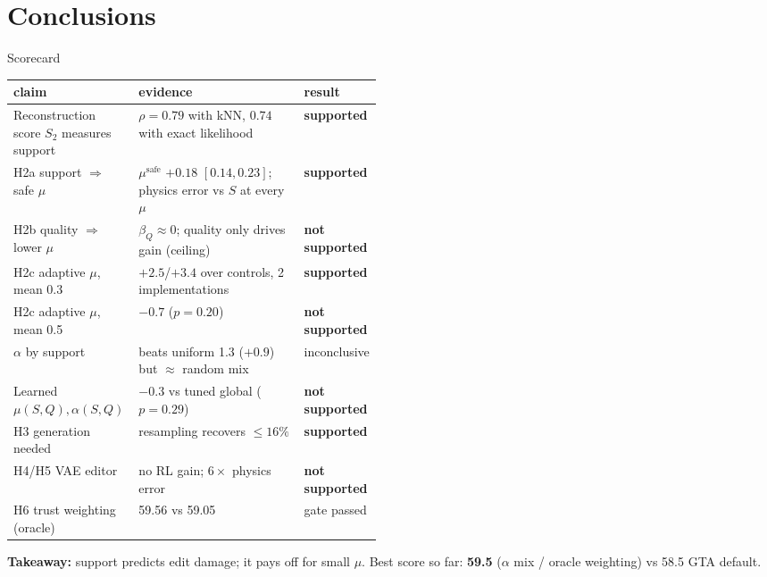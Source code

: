 \documentclass[aspectratio=169,11pt]{beamer}
\newcommand{\yes}{\textcolor{ok}{\textbf{supported}}}
\newcommand{\nope}{\textcolor{no}{\textbf{not supported}}}
\begin{document}
\section{Conclusions}
\begin{frame}[shrink=26]{Scorecard}
\small
\renewcommand{\arraystretch}{1.15}
\begin{tabularx}{\linewidth}{@{}p{0.34\linewidth}Yp{0.14\linewidth}@{}}
\toprule
claim & evidence & result\\
\midrule
Reconstruction score $S_2$ measures support & $\rho=0.79$ with kNN, $0.74$ with exact likelihood & \yes\\
H2a support $\Rightarrow$ safe $\mu$ & $\mu^{\text{safe}}$ $+0.18$ $[0.14,0.23]$; physics error vs $S$ at every $\mu$ & \yes\\
H2b quality $\Rightarrow$ lower $\mu$ & $\beta_Q\approx0$; quality only drives gain (ceiling) & \nope\\
H2c adaptive $\mu$, mean 0.3 & $+2.5$/$+3.4$ over controls, 2 implementations & \yes\\
H2c adaptive $\mu$, mean 0.5 & $-0.7$ ($p=0.20$) & \nope\\
$\alpha$ by support & beats uniform 1.3 ($+0.9$) but $\approx$ random mix & inconclusive\\
Learned $\mu(S,Q),\alpha(S,Q)$ & $-0.3$ vs tuned global ($p=0.29$) & \nope\\
H3 generation needed & resampling recovers $\le16\%$ & \yes\\
H4/H5 VAE editor & no RL gain; $6\times$ physics error & \nope\\
H6 trust weighting (oracle) & 59.56 vs 59.05 & gate passed\\
\bottomrule
\end{tabularx}
\vspace{0.3em}

\textbf{Takeaway:} support predicts edit damage; it pays off for small $\mu$. Best score so far: \textbf{59.5} ($\alpha$ mix / oracle weighting) vs 58.5 GTA default.
\end{frame}
\end{document}
